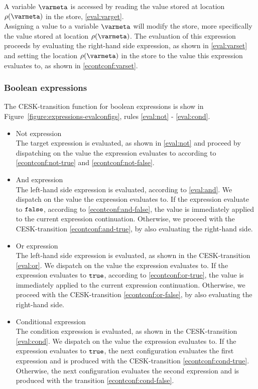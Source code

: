 \documentclass[a4paper,oneside]{article}
\begin{document}
A variable $\varmeta$ is accessed by reading the value stored at location $\env(\varmeta)$ in the store, \eqref{eval:varget}.\\[2mm]
Assigning a value to a variable $\varmeta$ will modify the store, more specifically the value stored at location  $\env(\varmeta)$.
The evaluation of this expression proceeds by evaluating the right-hand side expression, as shown in \eqref{eval:varset} and setting the location $\env(\varmeta)$ in the store to the value this expression evaluates to, as shown in \eqref{econtconf:varset}.


\subsubsection{Boolean expressions}
\label{subsubsec:bool-expressions}

The CESK-transition function for boolean expressions is show in Figure~\ref{figure:expressions-evalconfigs}, rules \eqref{eval:not} - \eqref{eval:cond}.

\begin{itemize}
    \item Not expression\\
        The target expression is evaluated, as shown in \eqref{eval:not} and proceed by dispatching on the value the expression evaluates to according to \eqref{econtconf:not-true} and \eqref{econtconf:not-false}.

    \item And expression\\
        The left-hand side expression is evaluated, according to \eqref{eval:and}.
        We dispatch on the value the expression evaluates to.
        If the expression evaluate to $\tt{false}$, according to \eqref{econtconf:and-false}, the value is immediately applied to the current expression continuation.
        Otherwise, we proceed with the CESK-transition \eqref{econtconf:and-true}, by also evaluating the right-hand side.

    \item Or expression\\
        The left-hand side expression is evaluated, as shown in the CESK-transition \eqref{eval:or}.
        We dispatch on the value the expression evaluates to.
        If the expression evaluates to $\tt{true}$, according to \eqref{econtconf:or-true}, the value is immediately applied to the current expression continuation.
        Otherwise, we proceed with the CESK-transition \eqref{econtconf:or-false}, by also evaluating the right-hand side.

    \item Conditional expression\\
        The condition expression is evaluated, as shown in the CESK-transition \eqref{eval:cond}.
        We dispatch on the value the expression evaluates to.
        If the expression evaluates to $\tt{true}$, the next configuration evaluates the first expression and is produced with the CESK-transition \eqref{econtconf:cond-true}.
        Otherwise, the next configuration evaluates the second expression and is produced with the transition \eqref{econtconf:cond-false}.

\end{itemize}
\end{document}

